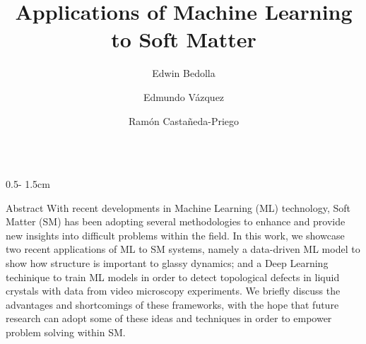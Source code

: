 \documentclass{uioposter}
\title{Applications of Machine Learning to Soft Matter}
\author
{%
    Edwin Bedolla\inst{1, $\dagger$}
    \and
    Edmundo Vázquez\inst{1}
    \and
    Ramón Castañeda-Priego\inst{1,2}
}
\institute
{
    \inst{1} División de Ciencias e Ingenierías
    \and
    \inst{2} Departamento de Ingeniería Física
}
\begin{document}
\begin{frame}
\begin{columns}[onlytextwidth]


\begin{column}{0.5\textwidth - 1.5cm}
    \begin{alertblock}{Abstract}
        With recent developments in Machine Learning (ML) technology, Soft Matter (SM) has been adopting several methodologies to enhance and provide new insights into difficult problems within the field. In this work, we showcase two recent applications of ML to SM systems, namely a data-driven ML model to show how structure is important to glassy dynamics; and a Deep Learning techinique to train ML models in order to detect topological defects in liquid crystals with data from video microscopy experiments. We briefly discuss the advantages and shortcomings of these frameworks, with the hope that future research can adopt some of these ideas and techniques in order to empower problem solving within SM.
    \end{alertblock}




\end{column}
\end{columns}
\end{frame}
\end{document}
